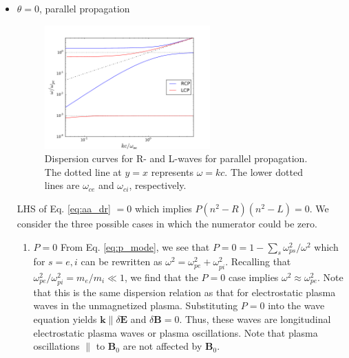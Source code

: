 	\begin{itemize}
		\item{$\theta=0$, parallel propagation}
		\begin{figure}
			\centering
			\includegraphics[width=0.6\textwidth]{figures/cmp_dispersion.pdf}
			\caption{Dispersion curves for R- and L-waves for parallel propagation. The dotted line at $y=x$ represents $\omega=kc$. The lower dotted lines are $\omega_{ce}$ and $\omega_{ci}$, respectively.}
		\end{figure}

		LHS of Eq. \ref{eq:aa_dr} $=0$ which implies $P(n^2 - R)(n^2 - L)=0$. We consider the three possible cases in which the numerator could be zero.

		\begin{enumerate}
			\item{$P=0$}
			From Eq. \ref{eq:p_mode}, we see that $P=0=1-\sum_s\omega_{ps}^2/\omega^2$ which for $s=e,i$ can be rewritten as $\omega^2=\omega_{pe}^2+\omega_{pi}^2$. Recalling that $\omega_{pe}^2/\omega_{pi}^2=m_e/m_i\ll1$, we find that the $P=0$ case implies $\omega^2\approx\omega_{pe}^2$. Note that this is the same dispersion relation as that for electrostatic plasma waves in the unmagnetized plasma. Substituting $P=0$ into the wave equation yields $\mathbf{k}\parallel\delta\mathbf{E}$ and $\delta\mathbf{B}=0$. Thus, these waves are longitudinal electrostatic plasma waves or plasma oscillations. Note that plasma oscillations $\parallel$ to $\mathbf{B}_0$ are not affected by $\mathbf{B}_0$. 
			

\end{enumerate}
\end{itemize}

